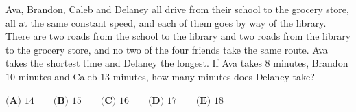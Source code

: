 Ava, Brandon, Caleb and Delaney all drive from their school to the grocery store, all at the same constant speed, and each of them goes by way of the library. There are two roads from the school to the library and two roads from the library to the grocery store, and no two of the four friends take the same route. Ava takes the shortest time and Delaney the longest. If Ava takes $8$ minutes, Brandon $10$ minutes and Caleb $13$ minutes, how many minutes does Delaney take?

$\textbf{(A) }14\qquad\textbf{(B) }15\qquad\textbf{(C) }16\qquad\textbf{(D) }17\qquad\textbf{(E) }18$
